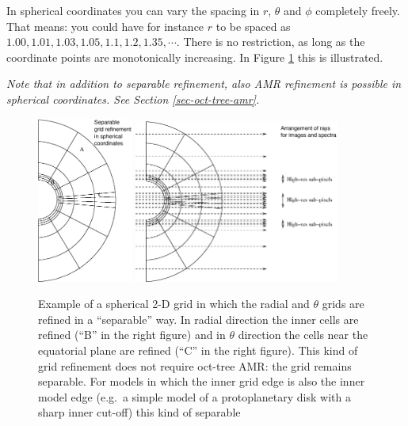 \documentclass{report}
\begin{document}
In spherical coordinates you can vary the spacing in $r$, $\theta$ and
$\phi$ completely freely. That means: you could have for instance $r$
to be spaced as $1.00, 1.01, 1.03, 1.05, 1.1, 1.2, 1.35, \cdots$. There is
no restriction, as long as the coordinate points are monotonically
increasing. In Figure \ref{fig-spher-sep-ref} this is illustrated. 

{\em Note that in addition to separable refinement, also AMR refinement
is possible in spherical coordinates. See Section \ref{sec-oct-tree-amr}.}

%
\begin{figure}
\centerline{\includegraphics[width=0.28\textwidth]{spher_grid_ref_txt.eps}
\hspace{4em}\includegraphics[width=0.6\textwidth]{spher_grid_ref_rays.eps}}
\caption{\label{fig-spher-sep-ref} Example of a spherical 2-D grid in which
  the radial and $\theta$ grids are refined in a ``separable'' way. In
  radial direction the inner cells are refined (``B'' in the right figure)
  and in $\theta$ direction the cells near the equatorial plane are refined
  (``C'' in the right figure). This kind of grid refinement does not require
  oct-tree AMR: the grid remains separable. For models in which the inner
  grid edge is also the inner model edge (e.g.\ a simple model of a
  protoplanetary disk with a sharp inner cut-off) this kind of separable
}
\end{figure}
\end{document}
